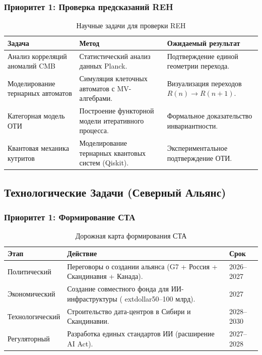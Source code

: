 \documentclass[11pt, a4paper]{article}
\begin{document}
\subsubsection*{Приоритет 1: Проверка предсказаний REH}
\begin{table}[H]
\centering
\begin{tabular}{l l l}
\toprule
\textbf{Задача} & \textbf{Метод} & \textbf{Ожидаемый результат} \\
\midrule
Анализ корреляций аномалий CMB & Статистический анализ данных Planck. & Подтверждение единой геометрии перехода. \\
Моделирование тернарных автоматов & Симуляция клеточных автоматов с MV-алгебрами. & Визуализация переходов $R(n) \rightarrow R(n+1)$. \\
Категорная модель ОТИ & Построение функторной модели итеративного процесса. & Формальное доказательство инвариантности. \\
Квантовая механика кутритов & Моделирование тернарных квантовых систем (Qiskit). & Экспериментальное подтверждение ОТИ. \\
\bottomrule
\end{tabular}
\caption{Научные задачи для проверки REH}
\end{table}

\subsection{Технологические Задачи (Северный Альянс)}
\subsubsection*{Приоритет 1: Формирование СТА}
\begin{table}[H]
\centering
\begin{tabular}{l l l}
\toprule
\textbf{Этап} & \textbf{Действие} & \textbf{Срок} \\
\midrule
Политический & Переговоры о создании альянса (G7 + Россия + Скандинавия + Канада). & 2026--2027 \\
Экономический & Создание совместного фонда для ИИ-инфраструктуры (	extdollar50--100 млрд). & 2027 \\
Технологический & Строительство дата-центров в Сибири и Скандинавии. & 2028--2030 \\
Регуляторный & Разработка единых стандартов ИИ (расширение AI Act). & 2027--2028 \\
\bottomrule
\end{tabular}
\caption{Дорожная карта формирования СТА}
\end{table}
\end{document}
